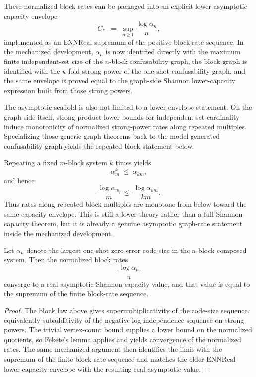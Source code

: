 These normalized block rates can be packaged into an explicit lower asymptotic capacity envelope
\[
C_* \;:=\; \sup_{n\ge 1} \frac{\log \alpha_n}{n},
\]
implemented as an $\mathrm{ENNReal}$ supremum of the positive block-rate sequence. In the mechanized development, $\alpha_n$ is now identified directly with the maximum finite independent-set size of the $n$-block confusability graph, the block graph is identified with the $n$-fold strong power of the one-shot confusability graph, and the same envelope is proved equal to the graph-side Shannon lower-capacity expression built from those strong powers.

The asymptotic scaffold is also not limited to a lower envelope statement. On the graph side itself, strong-product lower bounds for independent-set cardinality induce monotonicity of normalized strong-power rates along repeated multiples. Specializing those generic graph theorems back to the model-generated confusability graph yields the repeated-block statement below.

Repeating a fixed $m$-block system $k$ times yields
\[
\alpha_m^k \;\le\; \alpha_{km},
\]
and hence
\[
\frac{\log \alpha_m}{m} \;\le\; \frac{\log \alpha_{km}}{km}.
\]
Thus rates along repeated block multiples are monotone from below toward the same capacity envelope. This is still a lower theory rather than a full Shannon-capacity theorem, but it is already a genuine asymptotic graph-rate statement inside the mechanized development.

\begin{theorem}\label{thm:asymptotic-capacity}
Let $\alpha_n$ denote the largest one-shot zero-error code size in the $n$-block composed system. Then the normalized block rates
\[
\frac{\log \alpha_n}{n}
\]
converge to a real asymptotic Shannon-capacity value, and that value is equal to the supremum of the finite block-rate sequence.
\end{theorem}

\begin{proof}
The block law above gives supermultiplicativity of the code-size sequence, equivalently subadditivity of the negative log-independence sequence on strong powers. The trivial vertex-count bound supplies a lower bound on the normalized quotients, so Fekete's lemma applies and yields convergence of the normalized rates. The same mechanized argument then identifies the limit with the supremum of the finite block-rate sequence and matches the older $\mathrm{ENNReal}$ lower-capacity envelope with the resulting real asymptotic value.
\end{proof}

